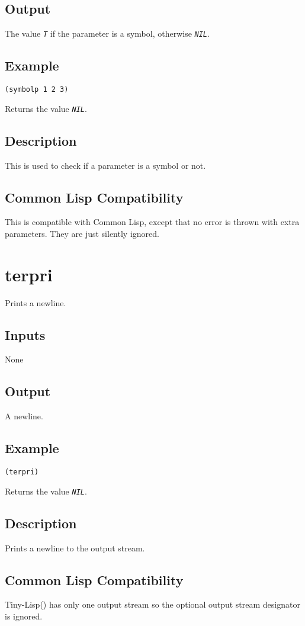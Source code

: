 \documentclass[10pt, openany]{book}
\newcommand{\constant}[1]{\emph{\texttt{#1}}}
\newcommand{\tl}{Tiny-Lisp}
\newcommand{\cl}{Common Lisp}
\begin{document}
\subsection{Output}
The value \constant{T} if the parameter is a symbol, otherwise \constant{NIL}.
\subsection{Example}
\begin{lstlisting}
(symbolp 1 2 3)
\end{lstlisting}
Returns the value \constant{NIL}.
\subsection{Description}
This is used to check if a parameter is a symbol or not.
\subsection{Common Lisp Compatibility}
This is compatible with \cl, except that no error is thrown with extra parameters.  They are just silently ignored.

\section{terpri}
Prints a newline.
\subsection{Inputs}
None
\subsection{Output}
A newline.
\subsection{Example}
\begin{lstlisting}
(terpri)
\end{lstlisting}
Returns the value \constant{NIL}.
\subsection{Description}
Prints a newline to the output stream.
\subsection{Common Lisp Compatibility}
\tl() has only one output stream so the optional output stream designator is ignored.
\end{document}
